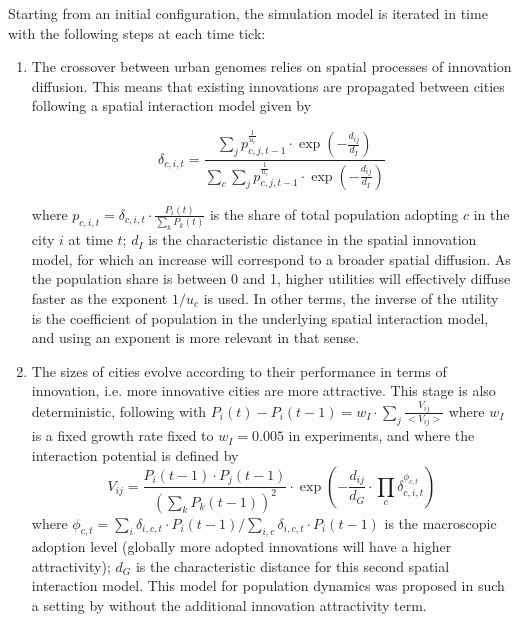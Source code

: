 \documentclass[letterpaper]{article}
\begin{document}
Starting from an initial configuration, the simulation model is iterated in time with the following steps at each time tick:

\begin{enumerate}
	\item The crossover between urban genomes relies on spatial processes of innovation diffusion. This means that existing innovations are propagated between cities following a spatial interaction model given by

\begin{equation}
\delta_{c,i,t} = \frac{\sum_j p_{c,j,t-1}^{\frac{1}{u_c}} \cdot \exp{(-\frac{d_{ij}}{d_I})}}{\sum_c \sum_j p_{c,j,t-1}^{\frac{1}{u_c}} \cdot \exp{(-\frac{d_{ij}}{d_I})}}
\end{equation}

where $p_{c,i,t} = \delta_{c,i,t} \cdot \frac{P_{i}(t)}{\sum_k P_k (t)}$ is the share of total population adopting $c$ in the city $i$ at time $t$; $d_I$ is the characteristic distance in the spatial innovation model, for which an increase will correspond to a broader spatial diffusion. As the population share is between 0 and 1, higher utilities will effectively diffuse faster as the exponent $1/u_c$ is used. In other terms, the inverse of the utility is the coefficient of population in the underlying spatial interaction model, and using an exponent is more relevant in that sense.


	\item The sizes of cities evolve according to their performance in terms of innovation, i.e. more innovative cities are more attractive. This stage is also deterministic, following  with $P_i(t) - P_i(t-1) = w_I\cdot \sum_j \frac{V_{ij}}{<V_{ij}>}$ where $w_I$ is a fixed growth rate fixed to $w_I = 0.005$ in experiments, and where the interaction potential is defined by
\begin{equation}
V_{ij}= \frac{P_{i}(t-1) \cdot P_{j}(t-1)}{(\sum_k P_k(t-1))^2} \cdot \exp{\left(-\frac{d_{ij}}{d_G} \cdot \prod_c \delta_{c,i,t}^{\phi_{c,t}}\right)}
\end{equation}
where $\phi_{c,t} = \sum_i \delta_{i,c,t}\cdot P_i(t-1) /\sum_{i,c} \delta_{i,c,t}\cdot P_{i}(t-1)$ is the macroscopic adoption level (globally more adopted innovations will have a higher attractivity); $d_G$ is the characteristic distance for this second spatial interaction model. This model for population dynamics was proposed in such a setting by \citep{raimbault2020indirect} without the additional innovation attractivity term.


\end{enumerate}
\end{document}
